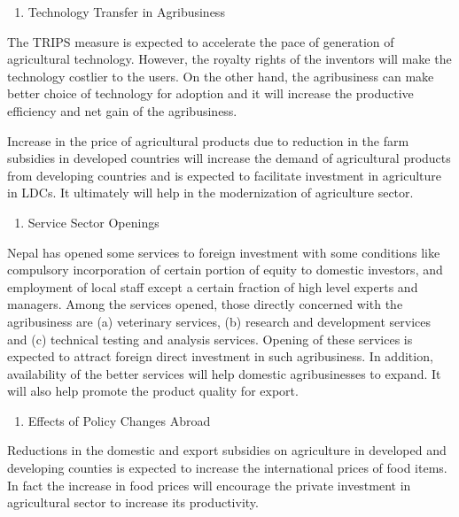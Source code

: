 \documentclass[
  openany]{book}
\providecommand{\tightlist}{%
  \setlength{\itemsep}{0pt}\setlength{\parskip}{0pt}}
\begin{document}
\begin{enumerate}
\def\labelenumi{\arabic{enumi}.}
\setcounter{enumi}{5}
\tightlist
\item
  Technology Transfer in Agribusiness
\end{enumerate}

The TRIPS measure is expected to accelerate the pace of generation of agricultural technology. However, the royalty rights of the inventors will make the technology costlier to the users. On the other hand, the agribusiness can make better choice of technology for adoption and it will increase the productive efficiency and net gain of the agribusiness.

Increase in the price of agricultural products due to reduction in the farm subsidies in developed countries will increase the demand of agricultural products from developing countries and is expected to facilitate investment in agriculture in LDCs. It ultimately will help in the modernization of agriculture sector.

\begin{enumerate}
\def\labelenumi{\arabic{enumi}.}
\setcounter{enumi}{6}
\tightlist
\item
  Service Sector Openings
\end{enumerate}

Nepal has opened some services to foreign investment with some conditions like compulsory incorporation of certain portion of equity to domestic investors, and employment of local staff except a certain fraction of high level experts and managers. Among the services opened, those directly concerned with the agribusiness are (a) veterinary services, (b) research and development services and (c) technical testing and analysis services. Opening of these services is expected to attract foreign direct investment in such agribusiness. In addition, availability of the better services will help domestic agribusinesses to expand. It will also help promote the product quality for export.

\begin{enumerate}
\def\labelenumi{\arabic{enumi}.}
\setcounter{enumi}{7}
\tightlist
\item
  Effects of Policy Changes Abroad
\end{enumerate}

Reductions in the domestic and export subsidies on agriculture in developed and developing counties is expected to increase the international prices of food items. In fact the increase in food prices will encourage the private investment in agricultural sector to increase its productivity.
\end{document}
